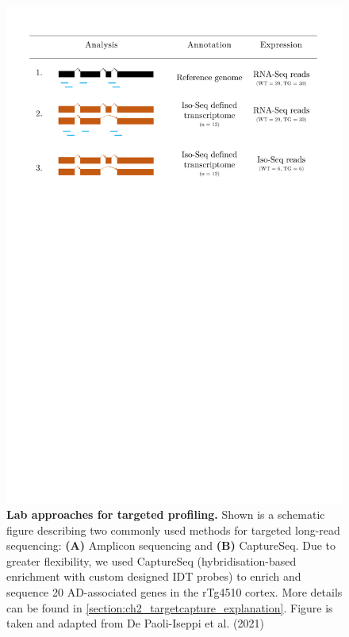 \begin{figure}[htp]
	\centering
	\includegraphics[page=6,trim={1cm 40cm 1cm 0cm},clip,scale = 0.5]{Figures/Tg4510_diff_figures.pdf}
	\captionsetup{width=0.95\textwidth}
	\caption[Lab approaches for targeted profiling]%
	{\textbf{Lab approaches for targeted profiling.} Shown is a schematic figure describing two commonly used methods for targeted long-read sequencing: \textbf{(A)} Amplicon sequencing and \textbf{(B)} CaptureSeq. Due to greater flexibility, we used CaptureSeq (hybridisation-based enrichment with custom designed IDT probes) to enrich and sequence 20 AD-associated genes in the rTg4510 cortex. More details can be found in \cref{section:ch2_targetcapture_explanation}. Figure is taken and adapted from De Paoli-Iseppi et al. (2021)\cite{DePaoli-Iseppi2021}}
	\label{fig:targeted_sequencing_method}
\end{figure}

